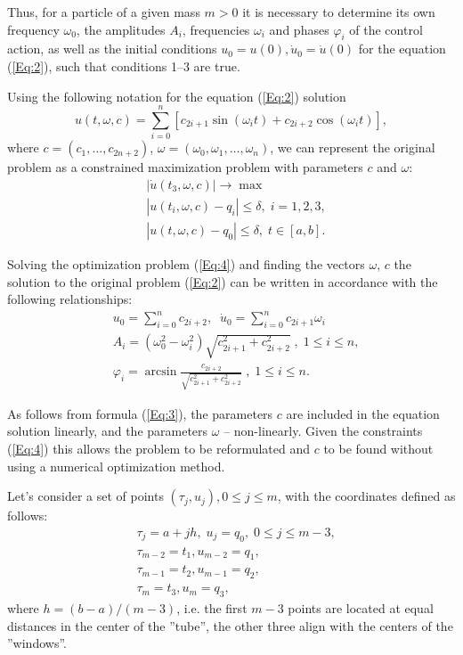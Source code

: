 \documentclass{llncs}
\begin{document}
Thus, for a particle of a given mass $m>0$ it is necessary to determine its own frequency $\omega_0$, the amplitudes $A_i$, frequencies $\omega_i$ and phases $\varphi_i$ of the control action, as well as the initial conditions $u_0=u(0), \dot{u}_0=\dot{u}(0)$ for the equation (\ref{Eq:2}), such that conditions 1--3 are true.

Using the following notation for the equation (\ref{Eq:2}) solution 
\begin{equation}\label{Eq:3}
u(t,\omega,c)=\sum^{n}_{i=0}\left[c_{2i+1}\sin(\omega_it) + c_{2i+2}\cos(\omega_it)\right],	
\end{equation}
where  $c=\left(c_1,\ldots,c_{2n+2}\right)$, $\omega=\left(\omega_0,\omega_1,\ldots,\omega_n\right)$, we can represent the original problem as a constrained maximization problem with parameters  $c$ and $\omega$:
\begin{eqnarray} \label{Eq:4}
  & \left| \dot{u}(t_3,\omega,c) \right| \rightarrow \max \nonumber \\
  & \left|u(t_i,\omega,c)-q_i\right|\leq\delta, \; i=1,2,3, \\
	& \left|u(t,\omega,c)-q_0\right|\leq\delta, \; t\in[a,b]. \nonumber 
\end{eqnarray}

Solving the optimization problem (\ref{Eq:4}) and finding the vectors $\omega$, $c$ the solution to the original problem (\ref{Eq:2}) can be written in accordance with the following relationships: 
\begin{eqnarray} \label{Eq:5}
  & u_0=\sum^{n}_{i=0}c_{2i+2}, \; \; \dot{u}_0 = \sum^{n}_{i=0}c_{2i+1}\omega_i \nonumber \\
  & A_i=\left(\omega^2_0-\omega^2_i\right)\sqrt{c^2_{2i+1}+c^2_{2i+2}}\;, \; 1\leq i\leq n, \\
	& \varphi_i=\arcsin\frac{c_{2i+2}}{\sqrt{c^2_{2i+1}+c^2_{2i+2}}}\;, \; 1\leq i\leq n. \nonumber 
\end{eqnarray}

As follows from formula (\ref{Eq:3}), the parameters $c$ are included in the equation solution linearly, and the parameters $\omega$ -- non-linearly. Given the constraints (\ref{Eq:4}) this allows the problem to be reformulated and $c$ to be found without using a numerical optimization method.

Let's consider a set of points $(\tau_j,u_j), 0\leq j\leq m$, with the coordinates defined as follows:
\begin{eqnarray} \label{Eq:6}
  & \tau_j=a+jh, \; u_j=q_0, \; 0\leq j\leq m-3,\\
  & \tau_{m-2}=t_1, u_{m-2}=q_1, \nonumber \\
	& \tau_{m-1}=t_2, u_{m-1}=q_2, \nonumber \\
	& \tau_{m}=t_3, u_{m}=q_3, \nonumber
\end{eqnarray}
where $h=(b-a)/(m-3)$, i.e. the first $m-3$ points are located at equal distances in the center of the ''tube'', the other three align with the centers of the ''windows''.
\end{document}
